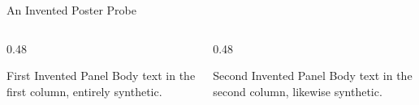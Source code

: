 \documentclass{poster}
\begin{document}
\begin{frame}{An Invented Poster Probe}
\begin{columns}
\begin{column}{0.48\textwidth}
\begin{block}{First Invented Panel}
Body text in the first column, entirely synthetic.
\end{block}
\end{column}
\begin{column}{0.48\textwidth}
\begin{block}{Second Invented Panel}
Body text in the second column, likewise synthetic.
\end{block}
\end{column}
\end{columns}
\end{frame}
\end{document}
